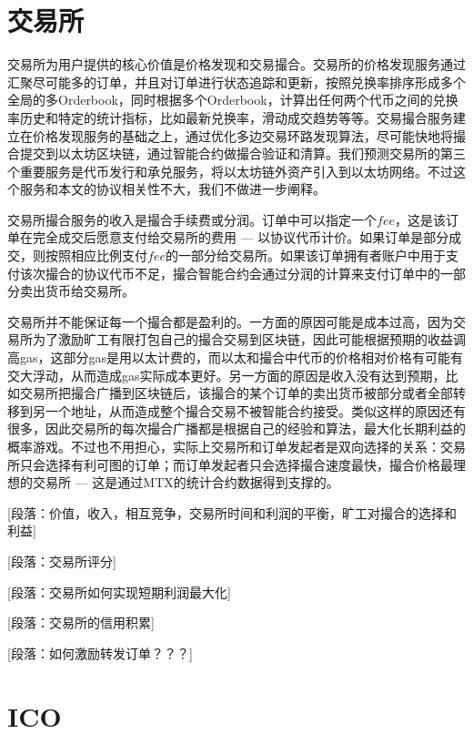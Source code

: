 \documentclass[UTF8,nofonts]{ctexart}
\begin{document}
\section{交易所\label{sec:exchange}}

交易所为用户提供的核心价值是价格发现和交易撮合。交易所的价格发现服务通过汇聚尽可能多的订单，并且对订单进行状态追踪和更新，按照兑换率排序形成多个全局的多Orderbook，同时根据多个Orderbook，计算出任何两个代币之间的兑换率历史和特定的统计指标，比如最新兑换率，滑动成交趋势等等。交易撮合服务建立在价格发现服务的基础之上，通过优化多边交易环路发现算法，尽可能快地将撮合提交到以太坊区块链，通过智能合约做撮合验证和清算。我们预测交易所的第三个重要服务是代币发行和承兑服务，将以太坊链外资产引入到以太坊网络。不过这个服务和本文的协议相关性不大，我们不做进一步阐释。

交易所撮合服务的收入是撮合手续费或分润。订单中可以指定一个$fee$，这是该订单在完全成交后愿意支付给交易所的费用 --- 以协议代币计价。如果订单是部分成交，则按照相应比例支付$fee$的一部分给交易所。如果该订单拥有者账户中用于支付该次撮合的协议代币不足，撮合智能合约会通过分润的计算来支付订单中的一部分卖出货币给交易所。

交易所并不能保证每一个撮合都是盈利的。一方面的原因可能是成本过高，因为交易所为了激励旷工有限打包自己的撮合交易到区块链，因此可能根据预期的收益调高gas，这部分gas是用以太计费的，而以太和撮合中代币的价格相对价格有可能有交大浮动，从而造成gas实际成本更好。另一方面的原因是收入没有达到预期，比如交易所把撮合广播到区块链后，该撮合的某个订单的卖出货币被部分或者全部转移到另一个地址，从而造成整个撮合交易不被智能合约接受。类似这样的原因还有很多，因此交易所的每次撮合广播都是根据自己的经验和算法，最大化长期利益的概率游戏。不过也不用担心，实际上交易所和订单发起者是双向选择的关系：交易所只会选择有利可图的订单；而订单发起者只会选择撮合速度最快，撮合价格最理想的交易所 --- 这是通过MTX的统计合约数据得到支撑的。

[段落：价值，收入，相互竞争，交易所时间和利润的平衡，旷工对撮合的选择和利益]

[段落：交易所评分]

[段落：交易所如何实现短期利润最大化]

[段落：交易所的信用积累]



[段落：如何激励转发订单？？？]


\section{ICO\label{sec:ico}}
\end{document}
